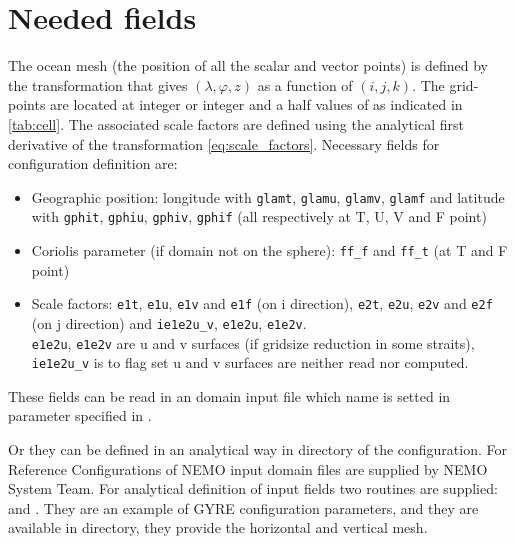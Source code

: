 \documentclass[../main/NEMO_manual]{subfiles}
\begin{document}
\section{Needed fields}
\label{sec:DOM_fields}
The ocean mesh (\ie the position of all the scalar and vector points) is defined by the transformation that
gives $(\lambda,\varphi,z)$ as a function of $(i,j,k)$.
The grid-points are located at integer or integer and a half values of as indicated in \autoref{tab:cell}.
The associated scale factors are defined using the analytical first derivative of the transformation
\autoref{eq:scale_factors}.
Necessary fields for configuration definition are:

\begin{itemize}
\item
  Geographic position:
  longitude with \texttt{glamt}, \texttt{glamu}, \texttt{glamv}, \texttt{glamf} and
  latitude  with \texttt{gphit}, \texttt{gphiu}, \texttt{gphiv}, \texttt{gphif}
  (all respectively at T, U, V and F point)
\item
  Coriolis parameter (if domain not on the sphere): \texttt{ff\_f} and \texttt{ff\_t}
  (at T and F point)
\item
  Scale factors:
  \texttt{e1t}, \texttt{e1u}, \texttt{e1v} and \texttt{e1f} (on i direction),
  \texttt{e2t}, \texttt{e2u}, \texttt{e2v} and \texttt{e2f} (on j direction) and
  \texttt{ie1e2u\_v}, \texttt{e1e2u}, \texttt{e1e2v}. \\
  \texttt{e1e2u}, \texttt{e1e2v} are u and v surfaces (if gridsize reduction in some straits), 
  \texttt{ie1e2u\_v} is to flag set u and v surfaces are neither read nor computed.
\end{itemize}
 
These fields can be read in an domain input file which name is setted in  parameter specified in
.


Or they can be defined in an analytical way in  directory of the configuration.
For Reference Configurations of NEMO input domain files are supplied by NEMO System Team.
For analytical definition of input fields two routines are supplied:  and .
They are an example of GYRE configuration parameters, and they are available in  directory,
they provide the horizontal and vertical mesh.
\end{document}
